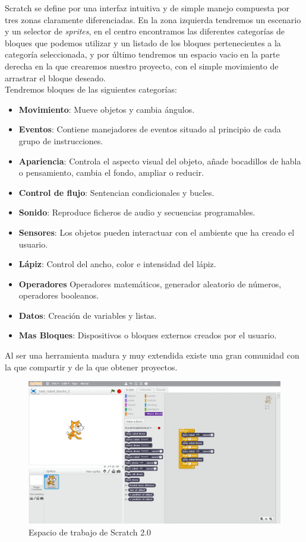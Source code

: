 Scratch se define por una interfaz intuitiva y de simple manejo compuesta por tres zonas claramente diferenciadas. En la zona izquierda tendremos un escenario y un selector de \textit{sprites}, en el centro encontramos las diferentes categorías de bloques que podemos utilizar y un listado de los bloques pertenecientes a la categoría seleccionada, y por último tendremos un espacio vacio en la parte derecha en la que crearemos nuestro proyecto, con el simple movimiento de arrastrar el bloque deseado.\\

Tendremos bloques de las siguientes categorías:
\begin{itemize}
\item \textbf{Movimiento}: Mueve objetos y cambia ángulos.	  	 	
\item \textbf{Eventos}: Contiene manejadores de eventos situado al principio de cada grupo de instrucciones.
\item \textbf{Apariencia}: Controla el aspecto visual del objeto, añade bocadillos de habla o 
pensamiento, cambia el fondo, ampliar o reducir.	 	
\item \textbf{Control de flujo}: Sentencian condicionales y bucles. 
\item \textbf{Sonido}: Reproduce ficheros de audio y secuencias programables.	 	
\item \textbf{Sensores}: Los objetos pueden interactuar con el ambiente que ha creado el usuario.
\item \textbf{Lápiz}: Control del ancho, color e intensidad del lápiz.	 	
\item \textbf{Operadores} Operadores matemáticos, generador aleatorio de números, operadores booleanos.
\item \textbf{Datos}: Creación de variables y listas.	 	
\item \textbf{Mas Bloques}: Dispositivos o bloques externos creados por el usuario.
\end{itemize}

Al ser una herramienta madura y muy extendida existe una gran comunidad con la que compartir y de la que obtener proyectos.

\begin{figure}[H]
    \centering
    \includegraphics[scale=0.32]{img/scratch_IDE.png}
  	\caption{Espacio de trabajo de Scratch 2.0}
  	\label{fig:gazebo}
\end{figure}

